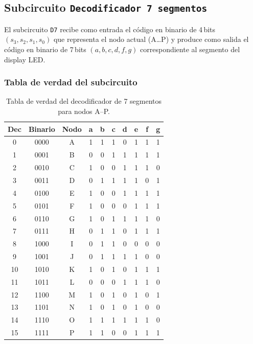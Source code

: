 \documentclass[12pt]{article}
\begin{document}
\newpage

\subsection{Subcircuito \texttt{Decodificador 7 segmentos}}


El subcircuito \texttt{D7} recibe como entrada el código en binario de 4\,bits  
\((s_{3},s_{2},s_{1},s_{0})\) que representa el nodo actual (A…P) y produce como salida  
el código en binario de 7\,bits \((a,b,c,d,f,g)\) correspondiente al segmento del display LED. 

\subsubsection{Tabla de verdad del subcircuito}

\begin{table}[ht]
\centering
\begin{tabular}{|c|c|c||c|c|c|c|c|c|c|}
\hline
\textbf{Dec} & \textbf{Binario} & \textbf{Nodo} 
  & \textbf{a} & \textbf{b} & \textbf{c} & \textbf{d} & \textbf{e} & \textbf{f} & \textbf{g} \\
\hline
0  & 0000 & A & 1 & 1 & 1 & 0 & 1 & 1 & 1 \\  
1  & 0001 & B & 0 & 0 & 1 & 1 & 1 & 1 & 1 \\  
2  & 0010 & C & 1 & 0 & 0 & 1 & 1 & 1 & 0 \\  
3  & 0011 & D & 0 & 1 & 1 & 1 & 1 & 0 & 1 \\  
4  & 0100 & E & 1 & 0 & 0 & 1 & 1 & 1 & 1 \\  
5  & 0101 & F & 1 & 0 & 0 & 0 & 1 & 1 & 1 \\  
6  & 0110 & G & 1 & 0 & 1 & 1 & 1 & 1 & 0 \\  
7  & 0111 & H & 0 & 1 & 1 & 0 & 1 & 1 & 1 \\  
8  & 1000 & I & 0 & 1 & 1 & 0 & 0 & 0 & 0 \\  
9  & 1001 & J & 0 & 1 & 1 & 1 & 1 & 0 & 0 \\  
10 & 1010 & K & 1 & 0 & 1 & 0 & 1 & 1 & 1 \\  
11 & 1011 & L & 0 & 0 & 0 & 1 & 1 & 1 & 0 \\  
12 & 1100 & M & 1 & 0 & 1 & 0 & 1 & 0 & 1 \\  
13 & 1101 & N & 1 & 0 & 1 & 0 & 1 & 0 & 0 \\  
14 & 1110 & O & 1 & 1 & 1 & 1 & 1 & 1 & 0 \\  
15 & 1111 & P & 1 & 1 & 0 & 0 & 1 & 1 & 1 \\  
\hline
\end{tabular}
\caption{Tabla de verdad del decodificador de 7 segmentos para nodos A–P.}
\label{tab:7seg_decoder}
\end{table}
\end{document}
